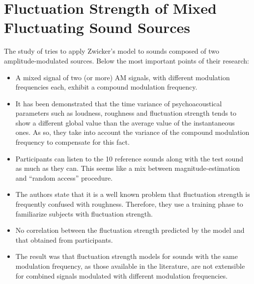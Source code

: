 \section{Fluctuation Strength of Mixed Fluctuating Sound Sources}

The study of \citet{Accolti2009Fluctuation} tries to apply Zwicker's model to
sounds composed of two amplitude-modulated sources. Below the most important
points of their research:

\begin{itemize}
    \item A mixed signal of two (or more) AM signals, with different modulation
        frequencies each, exhibit a compound modulation frequency.
    \item It has been demonstrated that the time variance of psychoacoustical
        parameters such as loudness, roughness and fluctuation strength tends to
        show a different global value than the average value of the
        instantaneous ones. As so, they take into account the variance of the
        compound modulation frequency to compensate for this fact. 
    \item Participants can listen to the 10 reference sounds along with the
        test sound as much as they can. This seems like a mix between
        magnitude-estimation and ``random access'' procedure.
    \item The authors state that it is a well known problem that fluctuation
        strength is frequently confused with roughness. Therefore, they use a
        training phase to familiarize subjects with fluctuation strength.
    \item No correlation between the fluctuation strength predicted by the model
        and that obtained from participants.
    \item  The result was that fluctuation strength models for sounds with the
        same modulation frequency, as those available in the literature, are not
        extensible for combined signals modulated with different modulation
        frequencies.
\end{itemize}
